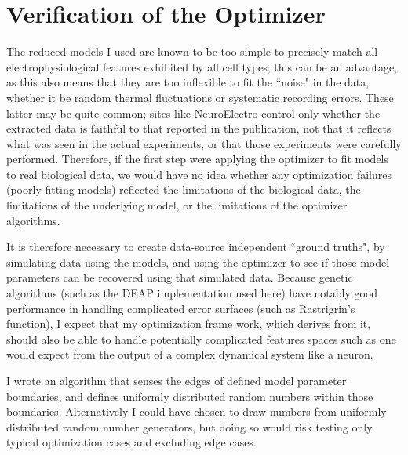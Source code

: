 \section{Verification of the Optimizer}
\label{sec:optimizer-verification}
The reduced models I used are known to be too simple to precisely match all electrophysiological features exhibited by all cell types; this can be an advantage, as this also means that they are too inflexible to fit the ``noise" in the data, whether it be random thermal fluctuations or systematic recording errors.
These latter may be quite common; sites like NeuroElectro control only whether the extracted data is faithful to that reported in the publication, not that it reflects what was seen in the actual experiments, or that those experiments were carefully performed.
Therefore, if the first step were applying the optimizer to fit models to real biological data, we would have no idea whether any optimization failures (poorly fitting models) reflected the limitations of the biological data, the limitations of the underlying model, or the limitations of the optimizer algorithms.

It is therefore necessary to create data-source independent ``ground truths", by simulating data using the models, and using the optimizer to see if those model parameters can be recovered using that simulated data.
Because genetic algorithms (such as the DEAP \citep{DEAP_JMLR2012} implementation used here) have notably good performance in handling complicated error surfaces (such as Rastrigrin's function), I expect that my optimization frame work, which derives from it, should also be able to handle potentially complicated features spaces such as one would expect from the output of a complex dynamical system like a neuron.

I wrote an algorithm that senses the edges of defined model parameter boundaries, and defines uniformly distributed random numbers within those boundaries. Alternatively I could have chosen to draw numbers from uniformly distributed random number generators, but doing so would risk testing only typical optimization cases and excluding edge cases.

